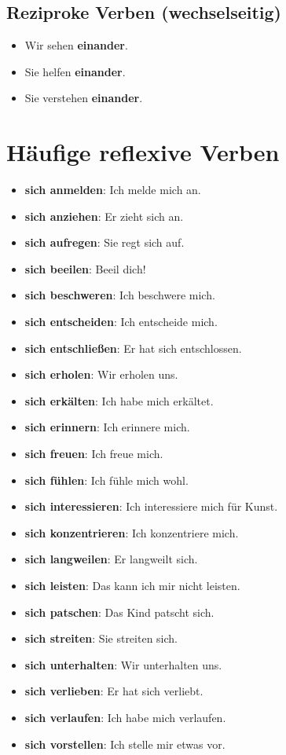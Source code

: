 \subsection{Reziproke Verben (wechselseitig)}
\begin{itemize}
    \item Wir sehen \textbf{einander}.
    \item Sie helfen \textbf{einander}.
    \item Sie verstehen \textbf{einander}.
\end{itemize}

\section{Häufige reflexive Verben}
\label{sec:ReflexivVerben}

\begin{itemize}
    \item \textbf{sich anmelden}: Ich melde mich an.
    \item \textbf{sich anziehen}: Er zieht sich an.
    \item \textbf{sich aufregen}: Sie regt sich auf.
    \item \textbf{sich beeilen}: Beeil dich!
    \item \textbf{sich beschweren}: Ich beschwere mich.
    \item \textbf{sich entscheiden}: Ich entscheide mich.
    \item \textbf{sich entschließen}: Er hat sich entschlossen.
    \item \textbf{sich erholen}: Wir erholen uns.
    \item \textbf{sich erkälten}: Ich habe mich erkältet.
    \item \textbf{sich erinnern}: Ich erinnere mich.
    \item \textbf{sich freuen}: Ich freue mich.
    \item \textbf{sich fühlen}: Ich fühle mich wohl.
    \item \textbf{sich interessieren}: Ich interessiere mich für Kunst.
    \item \textbf{sich konzentrieren}: Ich konzentriere mich.
    \item \textbf{sich langweilen}: Er langweilt sich.
    \item \textbf{sich leisten}: Das kann ich mir nicht leisten.
    \item \textbf{sich patschen}: Das Kind patscht sich.
    \item \textbf{sich streiten}: Sie streiten sich.
    \item \textbf{sich unterhalten}: Wir unterhalten uns.
    \item \textbf{sich verlieben}: Er hat sich verliebt.
    \item \textbf{sich verlaufen}: Ich habe mich verlaufen.
    \item \textbf{sich vorstellen}: Ich stelle mir etwas vor.
\end{itemize}

